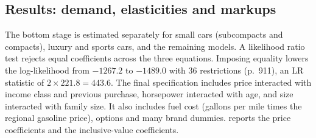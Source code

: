 \subsection{Results: demand, elasticities and markups}\label{sec:08-goldberg-results}

 The bottom stage is estimated separately for small cars (subcompacts and compacts),
luxury and sports cars, and the remaining models. A likelihood ratio test rejects equal coefficients across the
three equations. Imposing equality lowers the log-likelihood from $-1267.2$ to $-1489.0$ with 36 restrictions
(p.~911), an LR statistic of $2 \times 221.8 = 443.6$. The final specification includes price interacted with
income class and previous purchase, horsepower interacted with age, and size interacted with family size. It
also includes fuel cost (gallons per mile times the regional gasoline price), options and many brand
dummies.
 reports the price coefficients and the inclusive-value coefficients.


